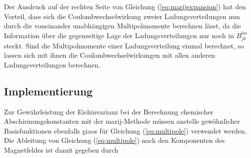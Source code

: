 	Der Ausdruck auf der rechten Seite von Gleichung (\ref{eq:marijexpansion}) hat den Vorteil, dass sich die Coulombwechselwirkung zweier Ladungsverteilungen nun durch die voneinander unabhängigen Multipolmomente berechnen lässt, da die Information über die gegenseitige Lage der Ladungsverteilungen nur noch in $B_{jk}^{lm}$ steckt. Sind die Multipolmomente einer Ladungsverteilung einmal berechnet, so lassen sich mit ihnen die Coulombwechselwirkungen mit allen anderen Ladungsverteilungen berechnen.\supercite{sierka2003fast}
	 
	\subsection{Implementierung}
Zur Gewährleistung der Eichinvarianz bei der Berechnung chemischer Abschirmungskonstanten mit der \ac{marij}-Methode müssen anstelle gewöhnlicher Basisfunktionen ebenfalls \acp{giao} für Gleichung (\ref{eq:multipole}) verwendet werden. Die Ableitung von Gleichung (\ref{eq:multipole}) nach den Komponenten des Magnetfeldes ist damit gegeben durch

